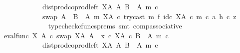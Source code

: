 \begin{isabellebody}
\ \ \ \ \ \ \ \ \ \ \ \ dist{\isacharunderscore}{\kern0pt}prod{\isacharunderscore}{\kern0pt}coprod{\isacharunderscore}{\kern0pt}left\ {\isacharparenleft}{\kern0pt}X\isactrlbsup A\isactrlesup {\isacharparenright}{\kern0pt}\ A\ {\isacharparenleft}{\kern0pt}B\ {\isasymsetminus}\ {\isacharparenleft}{\kern0pt}A{\isacharcomma}{\kern0pt}\ m{\isacharparenright}{\kern0pt}{\isacharparenright}{\kern0pt}\ {\isasymcirc}\isactrlsub c\isanewline
\ \ \ \ \ \ \ \ \ \ \ \ swap\ {\isacharparenleft}{\kern0pt}A\ {\isasymCoprod}\ {\isacharparenleft}{\kern0pt}B\ {\isasymsetminus}\ {\isacharparenleft}{\kern0pt}A{\isacharcomma}{\kern0pt}\ m{\isacharparenright}{\kern0pt}{\isacharparenright}{\kern0pt}{\isacharparenright}{\kern0pt}\ {\isacharparenleft}{\kern0pt}X\isactrlbsup A\isactrlesup {\isacharparenright}{\kern0pt}\ {\isasymcirc}\isactrlsub c\ {\isacharparenleft}{\kern0pt}try{\isacharunderscore}{\kern0pt}cast\ m\ {\isasymtimes}\isactrlsub f\ id\isactrlsub c\ {\isacharparenleft}{\kern0pt}X\isactrlbsup A\isactrlesup {\isacharparenright}{\kern0pt}{\isacharparenright}{\kern0pt}\ {\isasymcirc}\isactrlsub c\ {\isasymlangle}m\ {\isasymcirc}\isactrlsub c\ a{\isacharcomma}{\kern0pt}\ h\ {\isasymcirc}\isactrlsub c\ z{\isasymrangle}{\isachardoublequoteclose}\isanewline
\ \ \ \ \ \ \ \ \ \ \ \ \isamarkupfalse%
\ {\isacharparenleft}{\kern0pt}typecheck{\isacharunderscore}{\kern0pt}cfuncs{\isacharunderscore}{\kern0pt}prems{\isacharcomma}{\kern0pt}\ smt\ comp{\isacharunderscore}{\kern0pt}associative{}{\isacharparenright}{\kern0pt}\isanewline
\ \ \ \ \ \ \ \ \ \ \isamarkupfalse%
\ \isamarkupfalse%
\ {\isachardoublequoteopen}{\isacharparenleft}{\kern0pt}eval{\isacharunderscore}{\kern0pt}func\ X\ A\ {\isasymcirc}\isactrlsub c\ swap\ {\isacharparenleft}{\kern0pt}X\isactrlbsup A\isactrlesup {\isacharparenright}{\kern0pt}\ A{\isacharparenright}{\kern0pt}\ {\isasymamalg}\ {\isacharparenleft}{\kern0pt}x\ {\isasymcirc}\isactrlsub c\ {\isasymbeta}\isactrlbsub X\isactrlbsup A\isactrlesup \ {\isasymtimes}\isactrlsub c\ {\isacharparenleft}{\kern0pt}B\ {\isasymsetminus}\ {\isacharparenleft}{\kern0pt}A{\isacharcomma}{\kern0pt}\ m{\isacharparenright}{\kern0pt}{\isacharparenright}{\kern0pt}\isactrlesub {\isacharparenright}{\kern0pt}\ {\isasymcirc}\isactrlsub c\isanewline
\ \ \ \ \ \ \ \ \ \ \ \ dist{\isacharunderscore}{\kern0pt}prod{\isacharunderscore}{\kern0pt}coprod{\isacharunderscore}{\kern0pt}left\ {\isacharparenleft}{\kern0pt}X\isactrlbsup A\isactrlesup {\isacharparenright}{\kern0pt}\ A\ {\isacharparenleft}{\kern0pt}B\ {\isasymsetminus}\ {\isacharparenleft}{\kern0pt}A{\isacharcomma}{\kern0pt}\ m{\isacharparenright}{\kern0pt}{\isacharparenright}{\kern0pt}\ {\isasymcirc}\isactrlsub c\isanewline

\end{isabellebody}
